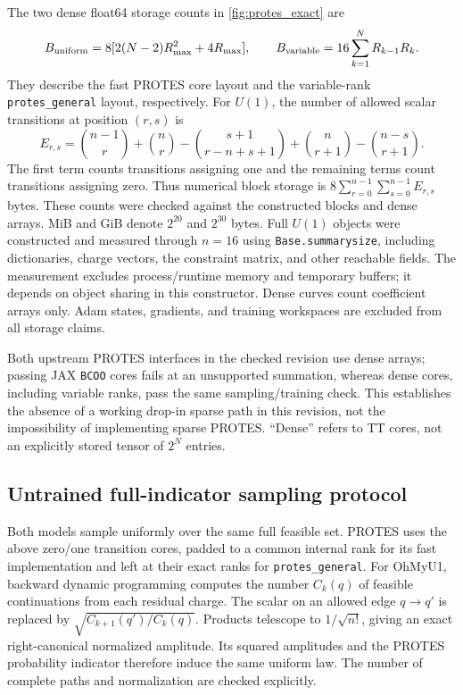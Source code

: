 The two dense float64 storage counts in \cref{fig:protes_exact} are
\begin{equation}
 B_{\rm uniform}=8[2(N-2)R_{\max}^2+4R_{\max}],\qquad
 B_{\rm variable}=16\sum_{k=1}^{N}R_{k-1}R_k.
\end{equation}
They describe the fast PROTES core layout and the variable-rank
\texttt{protes\_general} layout, respectively. For $U(1)$, the number of
allowed scalar transitions at position $(r,s)$ is
\begin{equation}
 E_{r,s}=\binom{n-1}{r}+\binom nr-\binom{s+1}{r-n+s+1}
                 +\binom n{r+1}-\binom{n-s}{r+1}.
\end{equation}
The first term counts transitions assigning one and the remaining terms
count transitions assigning zero. Thus numerical block storage is
$8\sum_{r=0}^{n-1}\sum_{s=0}^{n-1}E_{r,s}$ bytes. These counts were checked
against the constructed blocks and dense arrays. MiB and GiB denote $2^{20}$
and $2^{30}$ bytes. Full $U(1)$ objects were constructed and measured through
$n=16$ using \texttt{Base.summarysize}, including dictionaries, charge vectors,
the constraint matrix, and other reachable fields. The measurement excludes
process/runtime memory and temporary buffers; it depends on object sharing
in this constructor. Dense curves count coefficient arrays only. Adam states,
gradients, and training workspaces are excluded from all storage claims.

Both upstream PROTES interfaces in the checked revision use dense arrays;
passing JAX \texttt{BCOO} cores fails at an unsupported summation, whereas
dense cores, including variable ranks, pass the same sampling/training check.
This establishes the absence of a working drop-in sparse path in this
revision, not the impossibility of implementing sparse PROTES. ``Dense''
refers to TT cores, not an explicitly stored tensor of $2^N$ entries.

\subsection{Untrained full-indicator sampling protocol}
Both models sample uniformly over the same full feasible set. PROTES uses
the above zero/one transition cores, padded to a common internal rank for
its fast implementation and left at their exact ranks for
\texttt{protes\_general}. For OhMyU1, backward dynamic programming computes
the number $C_k(q)$ of feasible continuations from each residual charge.
The scalar on an allowed edge $q\to q'$ is replaced by
$\sqrt{C_{k+1}(q')/C_k(q)}$. Products telescope to $1/\sqrt{n!}$, giving an
exact right-canonical normalized amplitude. Its squared amplitudes and the
PROTES probability indicator therefore induce the same uniform law.
The number of complete paths and normalization are checked explicitly.

